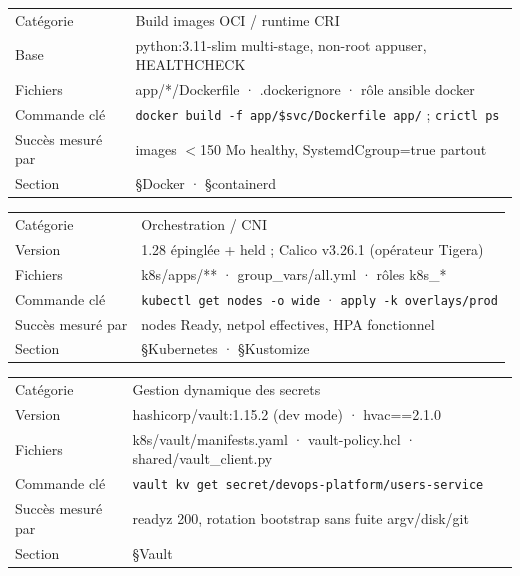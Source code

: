 \documentclass[12pt,a4paper]{article}
\begin{document}
\begin{tcolorbox}[colback=gray!4,colframe=black!60,arc=1.5mm,title={\bfseries Docker / containerd},fonttitle=\bfseries]
\small
\begin{tabular}{@{}p{2.4cm}p{10.8cm}@{}}
Catégorie & Build images OCI / runtime CRI \\
Base & python:3.11-slim multi-stage, non-root appuser, HEALTHCHECK \\
Fichiers & app/*/Dockerfile · .dockerignore · rôle ansible docker \\
Commande clé & \texttt{docker build -f app/\$svc/Dockerfile app/} ; \texttt{crictl ps} \\
Succès mesuré par & images $<$150 Mo healthy, SystemdCgroup=true partout \\
Section & \S Docker · \S containerd \\
\end{tabular}
\end{tcolorbox}

\begin{tcolorbox}[colback=gray!4,colframe=black!60,arc=1.5mm,title={\bfseries Kubernetes + Calico},fonttitle=\bfseries]
\small
\begin{tabular}{@{}p{2.4cm}p{10.8cm}@{}}
Catégorie & Orchestration / CNI \\
Version & 1.28 épinglée + held ; Calico v3.26.1 (opérateur Tigera) \\
Fichiers & k8s/apps/** · group\_vars/all.yml · rôles k8s\_* \\
Commande clé & \texttt{kubectl get nodes -o wide} · \texttt{apply -k overlays/prod} \\
Succès mesuré par & nodes Ready, netpol effectives, HPA fonctionnel \\
Section & \S Kubernetes · \S Kustomize \\
\end{tabular}
\end{tcolorbox}

\begin{tcolorbox}[colback=gray!4,colframe=black!60,arc=1.5mm,title={\bfseries Vault + hvac},fonttitle=\bfseries]
\small
\begin{tabular}{@{}p{2.4cm}p{10.8cm}@{}}
Catégorie & Gestion dynamique des secrets \\
Version & hashicorp/vault:1.15.2 (dev mode) · hvac==2.1.0 \\
Fichiers & k8s/vault/manifests.yaml · vault-policy.hcl · shared/vault\_client.py \\
Commande clé & \texttt{vault kv get secret/devops-platform/users-service} \\
Succès mesuré par & readyz 200, rotation bootstrap sans fuite argv/disk/git \\
Section & \S Vault \\
\end{tabular}
\end{tcolorbox}
\end{document}

